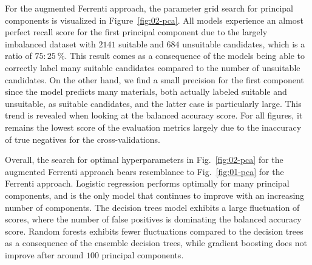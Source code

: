 \documentclass[superscriptaddress,unsortedaddress,
 amsmath,amssymb,
 aps,
]{revtex4-2}
\begin{document}
For the augmented Ferrenti approach, the parameter grid search for principal components is visualized in Figure~\ref{fig:02-pca}. All models experience an almost perfect recall score for the first principal component due to the largely imbalanced dataset with $2141$ suitable and $684$ unsuitable candidates, which is a ratio of $75:25 \ \%$. This result comes as a consequence of the models being able to correctly label many suitable candidates compared to the number of unsuitable candidates. 
On the other hand, we find a small precision for the first component since the model predicts many materials, both actually labeled suitable and unsuitable, as suitable candidates, and the latter case is particularly large. 
This trend is revealed when looking at the balanced accuracy score. For all figures, it remains the lowest score of the evaluation metrics largely due to the inaccuracy of true negatives for the cross-validations.  

\begin{table}[b]
\centering
\caption{Optimal number of principal components and the respective scores (standard deviation) for each of the four ML models logistic regression (LOG), decision trees (DT), random forests (RF) and gradient boosting (GB) in the augmented Ferrenti approach, as visualized by the dash-dotted line in Figure~\ref{fig:02-pca}.}
\label{tab:02-pc}
\noindent{}
\end{table}

Overall, the search for optimal hyperparameters in Fig.~\ref{fig:02-pca} for the augmented Ferrenti approach bears resemblance to Fig.~\ref{fig:01-pca} for the Ferrenti approach. Logistic regression performs optimally for many principal components, and is the only model that continues to improve with an increasing number of components. The decision trees model exhibits a large fluctuation of scores, where the number of false positives is dominating the balanced accuracy score. Random forests exhibits fewer fluctuations compared to the decision trees as a consequence of the ensemble decision trees, while gradient boosting does not improve after around $100$ principal components.
\end{document}
